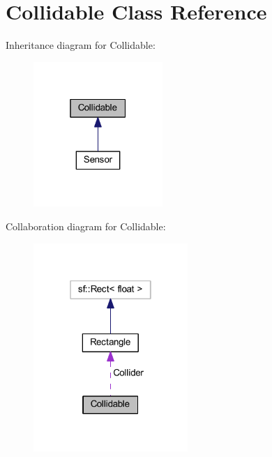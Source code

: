 \hypertarget{class_collidable}{\section{Collidable Class Reference}
\label{class_collidable}
}


Inheritance diagram for Collidable\-:\nopagebreak
\begin{figure}[H]
\begin{center}
\leavevmode
\includegraphics[width=139pt]{class_collidable__inherit__graph}
\end{center}
\end{figure}


Collaboration diagram for Collidable\-:\nopagebreak
\begin{figure}[H]
\begin{center}
\leavevmode
\includegraphics[width=166pt]{class_collidable__coll__graph}
\end{center}
\end{figure}

